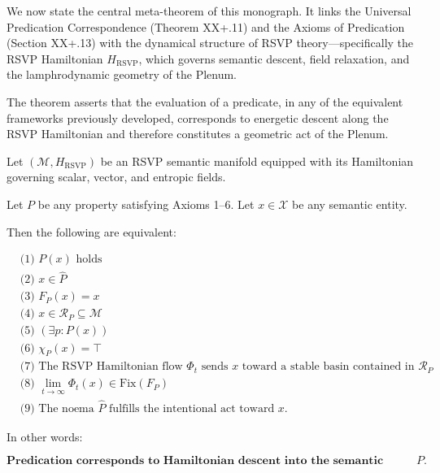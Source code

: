 \documentclass[12pt,letterpaper]{article}
\begin{document}
We now state the central meta-theorem of this monograph.  It links the Universal
Predication Correspondence (Theorem XX+.11) and the Axioms of Predication
(Section XX+.13) with the dynamical structure of RSVP theory---specifically the
RSVP Hamiltonian $H_{\mathrm{RSVP}}$, which governs semantic descent, field
relaxation, and the lamphrodynamic geometry of the Plenum.

The theorem asserts that the evaluation of a predicate, in any of the equivalent
frameworks previously developed, corresponds to energetic descent along the
RSVP Hamiltonian and therefore constitutes a geometric act of the Plenum.

\begin{meta-theorem}
Let $(\mathcal{M}, H_{\mathrm{RSVP}})$ be an RSVP semantic manifold equipped with
its Hamiltonian governing scalar, vector, and entropic fields.

Let $P$ be any property satisfying Axioms 1–6.  
Let $x \in \mathcal{X}$ be any semantic entity.

Then the following are equivalent:

\[
\boxed{
\begin{aligned}
    &\text{(1) } P(x) \text{ holds} \\
    &\text{(2) } x \in \widehat{P} \\
    &\text{(3) } F_P(x) = x \\
    &\text{(4) } x \in \mathcal{R}_P \subseteq \mathcal{M} \\
    &\text{(5) } (\exists p : P(x)) \\
    &\text{(6) } \chi_P(x) = \top \\
    &\text{(7) } \text{The RSVP Hamiltonian flow } \Phi_t \text{ sends } x 
                 \text{ toward a stable basin contained in } \mathcal{R}_P \\
    &\text{(8) } \lim_{t\to\infty} \Phi_t(x) \in \mathrm{Fix}(F_P) \\
    &\text{(9) } \text{The noema } \widehat{P} \text{ fulfills the intentional act toward } x.
\end{aligned}
}
\]

In other words:

\[
\boxed{
\textbf{Predication corresponds to Hamiltonian descent into the semantic region
associated with } P.
}
\]

\end{meta-theorem}
\end{document}

